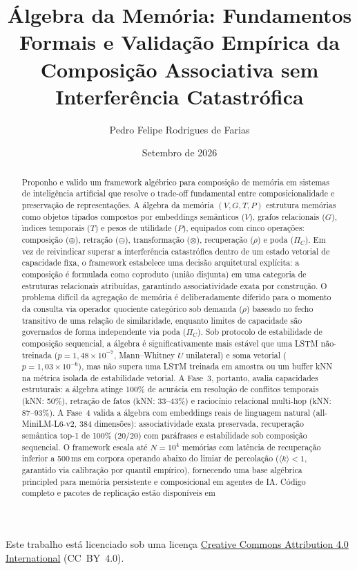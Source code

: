 \documentclass[11pt,a4paper]{article}
\title{\textbf{\'Algebra da Mem\'oria: Fundamentos Formais e Valida\c{c}\~ao Emp\'irica da Composi\c{c}\~ao Associativa sem Interfer\^encia Catastr\'ofica}}
\author[1]{Pedro Felipe Rodrigues de Farias}
\affil[1]{Pesquisador Independente}
\date{Setembro de 2026}
\theoremstyle{definition}
\begin{document}
\maketitle

\vspace{-1.5em}
\begin{center}
\small
Este trabalho est\'a licenciado sob uma licen\c{c}a \href{https://creativecommons.org/licenses/by/4.0/}{Creative Commons Attribution 4.0 International} (CC~BY~4.0).
\end{center}
\vspace{0.5em}

\begin{abstract}
Proponho e valido um framework alg\'ebrico para composi\c{c}\~ao de mem\'oria em sistemas de intelig\^encia artificial que resolve o trade-off fundamental entre composicionalidade e preserva\c{c}\~ao de representa\c{c}\~oes. A \'algebra da mem\'oria $(V, G, T, P)$ estrutura mem\'orias como objetos tipados compostos por embeddings sem\^anticos ($V$), grafos relacionais ($G$), \'{\i}ndices temporais ($T$) e pesos de utilidade ($P$), equipados com cinco opera\c{c}\~oes: composi\c{c}\~ao ($\oplus$), retra\c{c}\~ao ($\ominus$), transforma\c{c}\~ao ($\otimes$), recupera\c{c}\~ao ($\rho$) e poda ($\Pi_C$). Em vez de reivindicar superar a interfer\^encia catastr\'ofica dentro de um estado vetorial de capacidade fixa, o framework estabelece uma decis\~ao arquitetural expl\'icita: a composi\c{c}\~ao \'e formulada como coproduto (uni\~ao disjunta) em uma categoria de estruturas relacionais atribu\'idas, garantindo associatividade exata por constru\c{c}\~ao. O problema dif\'icil da agrega\c{c}\~ao de mem\'oria \'e deliberadamente diferido para o momento da consulta via operador quociente categ\'orico sob demanda ($\rho$) baseado no fecho transitivo de uma rela\c{c}\~ao de similaridade, enquanto limites de capacidade s\~ao governados de forma independente via poda ($\Pi_C$). Sob protocolo de estabilidade de composi\c{c}\~ao sequencial, a \'algebra \'e significativamente mais est\'avel que uma LSTM n\~ao-treinada ($p = 1{,}48 \times 10^{-7}$, Mann--Whitney $U$ unilateral) e soma vetorial ($p = 1{,}03 \times 10^{-6}$), mas n\~ao supera uma LSTM treinada em amostra ou um buffer kNN na m\'etrica isolada de estabilidade vetorial. A Fase~3, portanto, avalia capacidades estruturais: a \'algebra atinge 100\% de acur\'acia em resolu\c{c}\~ao de conflitos temporais (kNN: 50\%), retra\c{c}\~ao de fatos (kNN: 33--43\%) e racioc\'inio relacional multi-hop (kNN: 87--93\%). A Fase~4 valida a \'algebra com embeddings reais de linguagem natural (all-MiniLM-L6-v2, 384 dimens\~oes): associatividade exata preservada, recupera\c{c}\~ao sem\^antica top-1 de 100\% (20/20) com par\'afrases e estabilidade sob composi\c{c}\~ao sequencial. O framework escala at\'e $N = 10^4$ mem\'orias com lat\^encia de recupera\c{c}\~ao inferior a 500\,ms em corpora operando abaixo do limiar de percola\c{c}\~ao ($\langle k \rangle < 1$, garantido via calibra\c{c}\~ao por quantil emp\'irico), fornecendo uma base alg\'ebrica principled para mem\'oria persistente e composicional em agentes de IA. C\'odigo completo e pacotes de replica\c{c}\~ao est\~ao dispon\'iveis em 
\end{abstract}
\end{document}
